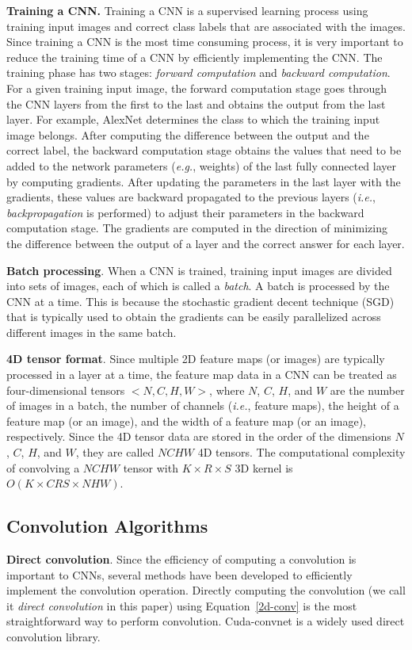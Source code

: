 {\bf Training a CNN.} Training a CNN is a supervised learning process using training input images and correct class labels that are associated with the images. Since training a CNN is the most time consuming process, it is very important to reduce the training time of a CNN by efficiently implementing the CNN. The training phase has two stages: \textit{forward computation} and \textit{backward computation}. For a given training input image, the forward computation stage goes through the CNN layers from the first to the last and obtains the output from the last layer. For example, AlexNet determines the class to which the training input image belongs. After computing the difference between the output and the correct label, the backward computation stage obtains the values that need to be added to the network parameters (\textit{e.g.}, weights) of the last fully connected layer by computing gradients. After updating the parameters in the last layer with the gradients, these values are backward propagated to the previous layers (\textit{i.e.}, \textit{backpropagation} is performed) to adjust their parameters in the backward computation stage. The gradients are computed in the direction of minimizing the difference between the output of a layer and the correct answer for each layer.

{\bf Batch processing}. When a CNN is trained, training input images are divided into sets of images, each of which is called a \textit{batch}. A batch is processed by the CNN at a time. This is because the stochastic gradient decent technique (SGD)\cite{onlinesgd} that is typically used to obtain the gradients can be easily parallelized across different images in the same batch. 

{\bf 4D tensor format}. Since multiple 2D feature maps (or images) are typically processed in a layer at a time, the feature map data in a CNN can be treated as four-dimensional tensors $<N, C, H, W>$, where $N$, $C$, $H$, and $W$ are the number of images in a batch, the number of channels (\textit{i.e.}, feature maps), the height of a feature map (or an image), and the width of a feature map (or an image), respectively. Since the 4D tensor data are stored in the order of the dimensions $N$, $C$, $H$, and $W$, they are called $NCHW$ 4D tensors. The computational complexity of convolving a $NCHW$ tensor with $K \times R \times S$ 3D kernel is $O(K \times CRS \times NHW)$.

\subsection{Convolution Algorithms}
\label{sec:algorithms}
{\bf Direct convolution}. Since the efficiency of computing a convolution is important to CNNs, several methods have been developed to efficiently implement the convolution operation. Directly computing the convolution (we call it \textit{direct convolution} in this paper) using Equation~\ref{2d-conv} is the most straightforward way to perform convolution. Cuda-convnet\cite{cuda-convnet} is a widely used direct convolution library.

